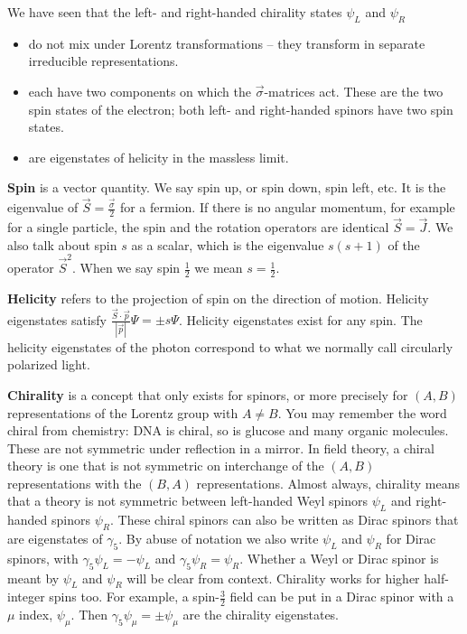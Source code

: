 \documentclass[11pt]{article}
\theoremstyle{definition}
\begin{document}
We have seen that the left- and right-handed chirality states \(\psi_L\) and \(\psi_R\)
\begin{itemize}
    \item do not mix under Lorentz transformations -- they transform in separate irreducible representations.
    \item each have two components on which the \(\vec{\sigma}\)-matrices act. These are the two spin states of the electron; both left- and right-handed spinors have two spin states.
    \item are eigenstates of helicity in the massless limit.
\end{itemize}

\textbf{Spin} is a vector quantity. We say spin up, or spin down, spin left, etc. It is the eigenvalue of \(\vec{S} = \frac{\vec{\sigma}}{2}\) for a fermion. If there is no angular momentum, for example for a single particle, the spin and the rotation operators are identical \(\vec{S} = \vec{J}\). We also talk about spin \(s\) as a scalar, which is the eigenvalue \(s(s+1)\) of the operator \(\vec{S}^2\). When we say spin \(\frac{1}{2}\) we mean \(s = \frac{1}{2}\).

\textbf{Helicity} refers to the projection of spin on the direction of motion. Helicity eigenstates satisfy \(\frac{\vec{S} \cdot \vec{p}}{|\vec{p}|} \Psi = \pm s \Psi\). Helicity eigenstates exist for any spin. The helicity eigenstates of the photon correspond to what we normally call circularly polarized light.

\textbf{Chirality} is a concept that only exists for spinors, or more precisely for \((A, B)\) representations of the Lorentz group with \(A \neq B\). You may remember the word chiral from chemistry: DNA is chiral, so is glucose and many organic molecules. These are not symmetric under reflection in a mirror. In field theory, a chiral theory is one that is not symmetric on interchange of the \((A, B)\) representations with the \((B, A)\) representations. Almost always, chirality means that a theory is not symmetric between left-handed Weyl spinors \(\psi_L\) and right-handed spinors \(\psi_R\). These chiral spinors can also be written as Dirac spinors that are eigenstates of \(\gamma_5\). By abuse of notation we also write \(\psi_L\) and \(\psi_R\) for Dirac spinors, with \(\gamma_5 \psi_L = -\psi_L\) and \(\gamma_5 \psi_R = \psi_R\). Whether a Weyl or Dirac spinor is meant by \(\psi_L\) and \(\psi_R\) will be clear from context. Chirality works for higher half-integer spins too. For example, a spin-\(\frac{3}{2}\) field can be put in a Dirac spinor with a \(\mu\) index, \(\psi_\mu\). Then \(\gamma_5 \psi_\mu = \pm \psi_\mu\) are the chirality eigenstates.
\end{document}
